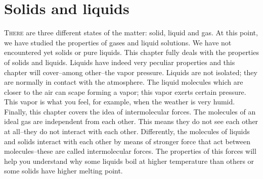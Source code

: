 \documentclass[main.tex]{subfiles}
\begin{document}
\linenumbers
  

\chapter[Solids and liquids]{Solids and liquids}


      \begin{marginfigure}
\end{marginfigure}


\lettrine[lines=4]{\color{black!45}T}{here} are three different states of the matter: solid, liquid and gas. At this point, we have studied the properties of gases and liquid solutions. We have not encountered yet solids or pure liquids. This chapter fully deals with the properties of solids and liquids. Liquids have indeed very peculiar properties and this chapter will cover--among other--the vapor pressure. Liquids are not isolated; they are normally in contact with the atmosphere. The liquid molecules which are closer to the air can scape forming a vapor; this vapor exerts certain pressure. This vapor is what you feel, for example, when the weather is very humid. Finally, this chapter covers the idea of intermolecular forces. The molecules of an ideal gas are independent from each other. This means they do not see each other at all--they do not interact with each other. Differently, the molecules of liquids and solids interact with each other by means of stronger force that act between molecules--these are called intermolecular forces. The properties of this forces will help you understand why some liquids boil at higher temperature than others or some solids have higher melting point. 
 
\end{document}
